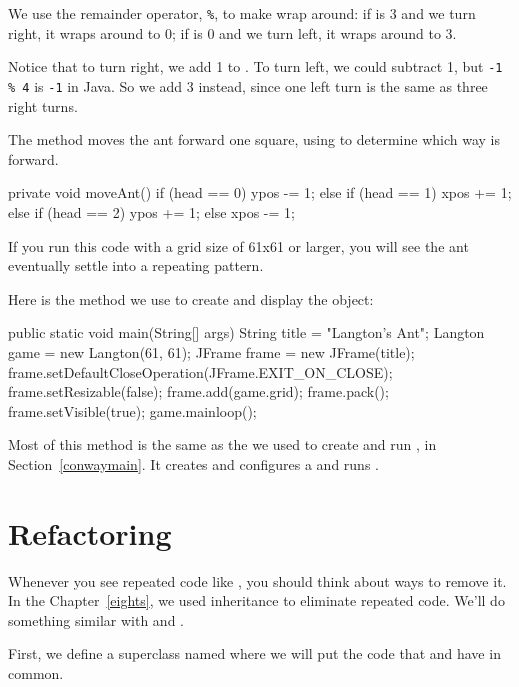 We use the remainder operator, \verb"%", to make  wrap around: if  is 3 and we turn right, it wraps around to 0; if  is 0 and we turn left, it wraps around to 3.

Notice that to turn right, we add 1 to .
To turn left, we could subtract 1, but \verb"-1 % 4" is \verb"-1" in Java.
So we add 3 instead, since one left turn is the same as three right turns.

The  method moves the ant forward one square, using  to determine which way is forward.

\begin{code}
private void moveAnt() {
    if (head == 0) {
        ypos -= 1;
    } else if (head == 1) {
        xpos += 1;
    } else if (head == 2) {
        ypos += 1;
    } else {
        xpos -= 1;
    }
}
\end{code}

If you run this code with a grid size of 61x61 or larger, you will see the ant eventually settle into a repeating pattern.

Here is the  method we use to create and display the  object:

\begin{code}
public static void main(String[] args) {
    String title = "Langton's Ant";
    Langton game = new Langton(61, 61);
    JFrame frame = new JFrame(title);
    frame.setDefaultCloseOperation(JFrame.EXIT_ON_CLOSE);
    frame.setResizable(false);
    frame.add(game.grid);
    frame.pack();
    frame.setVisible(true);
    game.mainloop();
}
\end{code}

Most of this method is the same as the  we used to create and run , in Section~\ref{conwaymain}.
It creates and configures a  and runs .


\section{Refactoring}

Whenever you see repeated code like , you should think about ways to remove it.
In the Chapter~\ref{eights}, we used inheritance to eliminate repeated code.
We'll do something similar with  and .

First, we define a superclass named  where we will put the code that  and  have in common.

